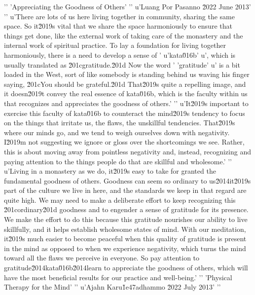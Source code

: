 '\n'
'Appreciating the Goodness of Others'
'\n'
u'Luang Por Pasanno \u2022 June 2013'
'\n'
u'There are lots of us here living together in community, sharing the same space. So it\u2019s vital that we share the space harmoniously to ensure that things get done, like the external work of taking care of the monastery and the internal work of spiritual practice. To lay a foundation for living together harmoniously, there is a need to develop a sense of '
u'kata\u016b'
u', which is usually translated as \u201cgratitude.\u201d Now the word '
'gratitude'
u' is a bit loaded in the West, sort of like somebody is standing behind us waving his finger saying, \u201cYou should be grateful.\u201d That\u2019s quite a repelling image, and it doesn\u2019t convey the real essence of kata\u016b, which is the faculty within us that recognizes and appreciates the goodness of others.'
'\n'
u'It\u2019s important to exercise this faculty of kata\u016b to counteract the mind\u2019s tendency to focus on the things that irritate us, the flaws, the unskillful tendencies. That\u2019s where our minds go, and we tend to weigh ourselves down with negativity. I\u2019m not suggesting we ignore or gloss over the shortcomings we see. Rather, this is about moving away from pointless negativity and, instead, recognizing and paying attention to the things people do that are skillful and wholesome.'
'\n'
u'Living in a monastery as we do, it\u2019s easy to take for granted the fundamental goodness of others. Goodness can seem so ordinary to us\u2014it\u2019s part of the culture we live in here, and the standards we keep in that regard are quite high. We may need to make a deliberate effort to keep recognizing this \u201cordinary\u201d goodness and to engender a sense of gratitude for its presence. We make the effort to do this because this gratitude nourishes our ability to live skillfully, and it helps establish wholesome states of mind. With our meditation, it\u2019s much easier to become peaceful when this quality of gratitude is present in the mind as opposed to when we experience negativity, which turns the mind toward all the flaws we perceive in everyone. So pay attention to gratitude\u2014kata\u016b\u2014learn to appreciate the goodness of others, which will have the most beneficial results for our practice and well-being.'
'\n'
'Physical Therapy for the Mind'
'\n'
u'Ajahn Karu\u1e47adhammo \u2022 July 2013'
'\n'
